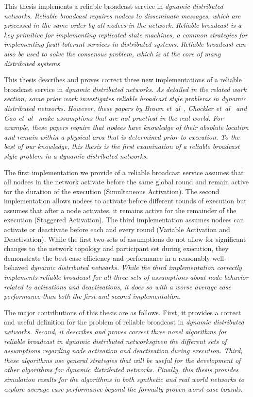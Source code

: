 \documentclass[english]{article}
\begin{document}
This thesis implements a reliable broadcast service in \em dynamic distributed networks\em. Reliable broadcast requires nodees to disseminate messages, which are processed in the same order by all nodees in the network. Reliable broadcast is a key primitive for implementing replicated state machines, a common strategies for implementing fault-tolerant services in distributed systems. Reliable broadcast can also be used to solve the consensus problem, which is at the core of many distributed systems.

This thesis describes and proves correct three new implementations of a reliable broadcast service in \em dynamic distributed networks\em. As detailed in the related work section, some prior work investigates reliable broadcast style problems in \em dynamic distributed networks\em. However, these papers by Brown et~al~\cite{Brown:2007}, Chockler et~al~\cite{Chockler:2008} and Gao et~al~\cite{Gao:2012} make assumptions that are not practical in the real world. For example, these papers require that nodees have knowledge of their absolute location and remain within a physical area that is determined prior to execution. To the best of our knowledge, this thesis is the first examination of a reliable broadcast style problem in a \em dynamic distributed networks\em.

The first implementation we provide of a reliable broadcast service assumes that all nodees in the network activate before the same global round and remain active for the duration of the execution (Simultaneous Activation). The second implementation allows nodees to activate before different rounds of execution but assumes that after a node activates, it remains active for the remainder of the execution (Staggered Activation).  The third implementation assumes nodees can activate or deactivate before each and every round (Variable Activation and Deactivation). While the first two sets of assumptions do not allow for significant changes to the network topology and participant set during execution, they demonstrate the best-case efficiency and performance in a reasonably well-behaved \em dynamic distributed networks\em. While the third implementation correctly implements reliable broadcast for all three sets of assumptions about node behavior related to activations and deactivations, it does so with a worse average case performance than both the first and second implementation. 

The major contributions of this thesis are as follows. First, it provides a correct and useful definition for the problem of reliable broadcast in \em dynamic distributed networks\em. Second, it describes and proves correct three novel algorithms for reliable broadcast in \em dynamic distributed networks\em given the different sets of assumptions regarding node activation and deactivation during execution. Third, these algorithms use general strategies that will be useful for the development of other algorithms for \em dynamic distributed networks\em. Finally, this thesis provides simulation results for the algorithms in both synthetic and real world networks to explore average case performance beyond the formally proven worst-case bounds.
\end{document}
